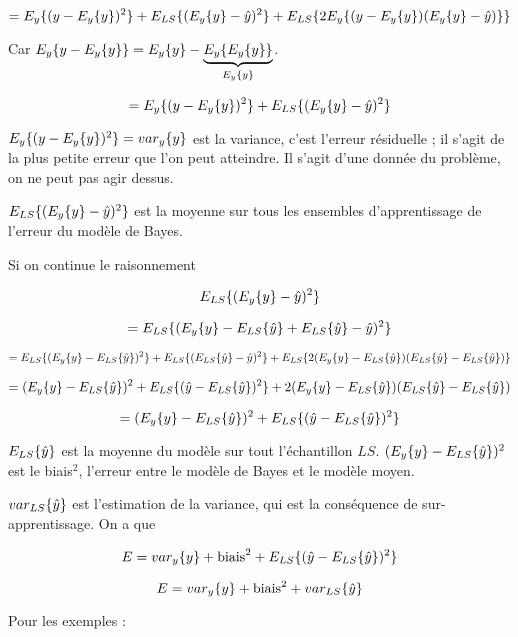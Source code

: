 	$$= E_y\{(y - E_y\{y\})^2\} + E_{LS}\{(E_y\{y\} - \hat{y})^2\} + E_{LS}\{2E_y\{(y - E_y\{y\})(E_y\{y\} - \hat{y})\}\}$$
	
	Car $E_y\{y - E_y\{y\}\} = E_y\{y\} - \underbrace{E_y\{E_y\{y\}\}}_{E_y\{y\}}$.
	
	$$=E_y\{(y - E_y\{y\})^2\} + E_{LS}\{(E_y\{y\} - \hat{y})^2\}$$
	
	$E_y\{(y - E_y\{y\})^2\} = var_y\{y\}$ est la variance, c'est l'erreur résiduelle ; il s'agit de la plus petite erreur que l'on peut atteindre. Il s'agit d'une donnée du problème, on ne peut pas agir dessus.
	
	$E_{LS}\{(E_y\{y\} - \hat{y})^2\}$ est la moyenne sur tous les ensembles d'apprentissage de l'erreur du modèle de Bayes.
	
	
	Si on continue le raisonnement
	
	$$E_{LS}\{(E_y\{y\} - \hat{y})^2\}$$
	
	$$ = E_{LS}\{(E_y\{y\} - E_{LS}\{\hat{y}\} + E_{LS}\{\hat{y}\} - \hat{y})^2\}$$
	
	$$ = E_{LS}\{(E_y\{y\} - E_{LS}\{\hat{y}\})^2\} + E_{LS}\{(E_{LS}\{\hat{y}\} - \hat{y})^2\} + E_{LS}\{2(E_y\{y\} - E_{LS}\{\hat{y}\})(E_{LS}\{\hat{y}\} - E_{LS}\{\hat{y}\})\}$$
	
	$$= (E_y\{y\} - E_{LS}\{\hat{y}\})^2 + E_{LS}\{(\hat{y} - E_{LS}\{\hat{y}\})^2\} + 2(E_y\{y\} - E_{LS}\{\hat{y}\})(E_{LS}\{\hat{y}\} - E_{LS}\{\hat{y}\})$$
	
	$$= (E_y\{y\} - E_{LS}\{\hat{y}\})^2 + E_{LS}\{(\hat{y} - E_{LS}\{\hat{y}\})^2\}$$

		
	$E_{LS}\{\hat{y}\}$ est la moyenne du modèle sur tout l'échantillon $LS$. $(E_y\{y\} - E_{LS}\{\hat{y}\})^2$ est le biais$^2$, l'erreur entre le modèle de Bayes et le modèle moyen.
		
	
	$var_{LS}\{\hat{y}\}$ est l'estimation de la variance, qui est la conséquence de sur-apprentissage. On a que
	
	$$E = var_y\{y\} + \text{biais}^2 + E_{LS}\{(\hat{y} - E_{LS}\{\hat{y}\})^2\}$$
	
	
	$$E = var_y\{y\} + \text{biais}^2 + var_{LS}\{\hat{y}\}$$
	
	Pour les exemples :
	
